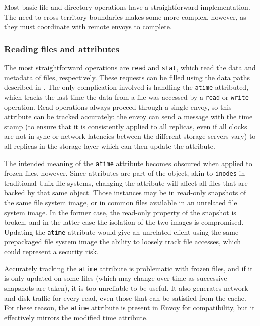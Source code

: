 Most basic file and directory operations have a straightforward implementation. The need to cross territory boundaries makes some more complex, however, as they must coordinate with remote envoys to complete.

\subsubsection{Reading files and attributes}

The most straightforward operations are \texttt{read} and \texttt{stat}, which read the data and metadata of files, respectively. These requests can be filled using the data paths described in . The only complication involved is handling the \texttt{atime} attributed, which tracks the last time the data from a file was accessed by a \texttt{read} or \texttt{write} operation. Read operations always proceed through a single envoy, so this attribute can be tracked accurately: the envoy can send a message with the time stamp (to ensure that it is consistently applied to all replicas, even if all clocks are not in sync or network latencies between the different storage servers vary) to all replicas in the storage layer which can then update the attribute.

The intended meaning of the \texttt{atime} attribute becomes obscured when applied to frozen files, however. Since attributes are part of the object, akin to \texttt{inodes} in traditional Unix file systems, changing the attribute will affect all files that are backed by that same object. Those instances may be in read-only snapshots of the same file system image, or in common files available in an unrelated file system image. In the former case, the read-only property of the snapshot is broken, and in the latter case the isolation of the two images is compromised. Updating the \texttt{atime} attribute would give an unrelated client using the same prepackaged file system image the ability to loosely track file accesses, which could represent a security risk.

Accurately tracking the \texttt{atime} attribute is problematic with frozen files, and if it is only updated on some files (which may change over time as successive snapshots are taken), it is too unreliable to be useful. It also generates network and disk traffic for every read, even those that can be satisfied from the cache. For these reason, the \texttt{atime} attribute is present in Envoy for compatibility, but it effectively mirrors the modified time attribute.

